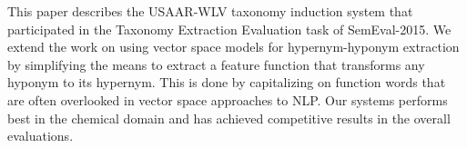 This paper describes the USAAR-WLV taxonomy induction system that participated in the Taxonomy Extraction Evaluation task of SemEval-2015. We extend the work on using vector space models for hypernym-hyponym extraction by simplifying the means to extract a feature function that transforms any hyponym to its hypernym. This is done by capitalizing on function words that are often overlooked in vector space approaches to NLP. Our systems performs best in the chemical domain and has achieved competitive results in the overall evaluations.
